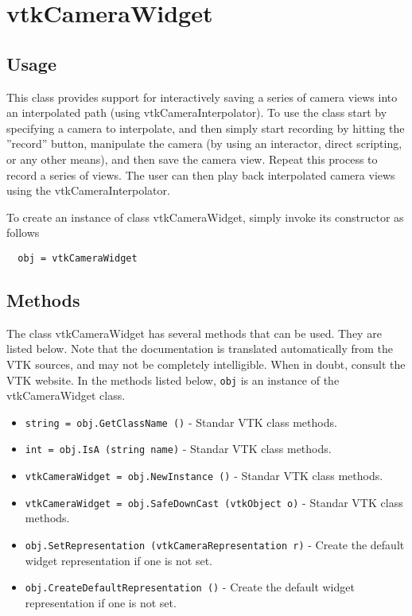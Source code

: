 \section{vtkCameraWidget}

\subsection{Usage}

 This class provides support for interactively saving a series of camera
 views into an interpolated path (using vtkCameraInterpolator). To use the
 class start by specifying a camera to interpolate, and then simply start
 recording by hitting the ''record'' button, manipulate the camera (by using
 an interactor, direct scripting, or any other means), and then save the
 camera view. Repeat this process to record a series of views.  The user
 can then play back interpolated camera views using the 
 vtkCameraInterpolator.

To create an instance of class vtkCameraWidget, simply
invoke its constructor as follows
\begin{verbatim}
  obj = vtkCameraWidget
\end{verbatim}
\subsection{Methods}

The class vtkCameraWidget has several methods that can be used.
  They are listed below.
Note that the documentation is translated automatically from the VTK sources,
and may not be completely intelligible.  When in doubt, consult the VTK website.
In the methods listed below, \verb|obj| is an instance of the vtkCameraWidget class.
\begin{itemize}
\item  \verb|string = obj.GetClassName ()| -  Standar VTK class methods.

\item  \verb|int = obj.IsA (string name)| -  Standar VTK class methods.

\item  \verb|vtkCameraWidget = obj.NewInstance ()| -  Standar VTK class methods.

\item  \verb|vtkCameraWidget = obj.SafeDownCast (vtkObject o)| -  Standar VTK class methods.

\item  \verb|obj.SetRepresentation (vtkCameraRepresentation r)| -  Create the default widget representation if one is not set. 

\item  \verb|obj.CreateDefaultRepresentation ()| -  Create the default widget representation if one is not set. 

\end{itemize}
